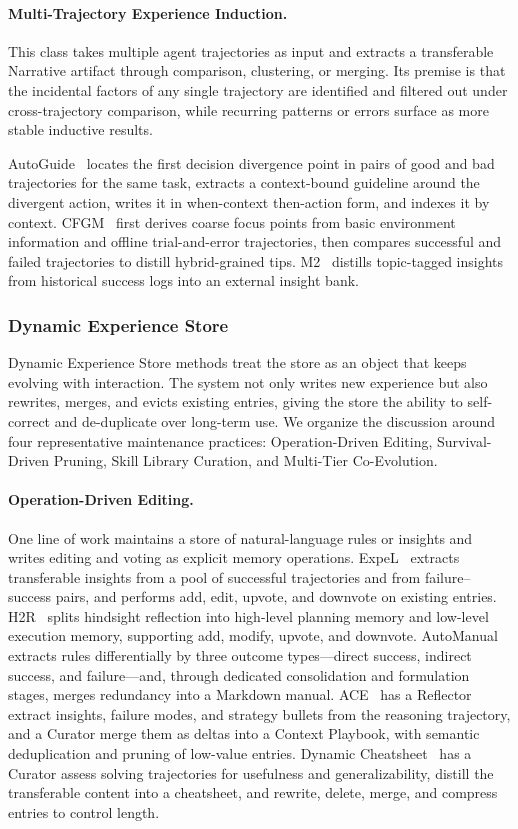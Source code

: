 \paragraph{Multi-Trajectory Experience Induction.} This class takes multiple agent trajectories as input and extracts a transferable Narrative artifact through comparison, clustering, or merging. Its premise is that the incidental factors of any single trajectory are identified and filtered out under cross-trajectory comparison, while recurring patterns or errors surface as more stable inductive results.

AutoGuide~\cite{Fu24} locates the first decision divergence point in pairs of good and bad trajectories for the same task, extracts a context-bound guideline around the divergent action, writes it in when-context then-action form, and indexes it by context. CFGM~\cite{Yan25} first derives coarse focus points from basic environment information and offline trial-and-error trajectories, then compares successful and failed trajectories to distill hybrid-grained tips. M2~\cite{Yan26b} distills topic-tagged insights from historical success logs into an external insight bank.

\subsubsection{Dynamic Experience Store}

Dynamic Experience Store methods treat the store as an object that keeps evolving with interaction. The system not only writes new experience but also rewrites, merges, and evicts existing entries, giving the store the ability to self-correct and de-duplicate over long-term use. We organize the discussion around four representative maintenance practices: Operation-Driven Editing, Survival-Driven Pruning, Skill Library Curation, and Multi-Tier Co-Evolution.

\paragraph{Operation-Driven Editing.} One line of work maintains a store of natural-language rules or insights and writes editing and voting as explicit memory operations. ExpeL~\cite{Zha23c} extracts transferable insights from a pool of successful trajectories and from failure--success pairs, and performs add, edit, upvote, and downvote on existing entries. H2R~\cite{Ye25b} splits hindsight reflection into high-level planning memory and low-level execution memory, supporting add, modify, upvote, and downvote. AutoManual~\cite{Che24} extracts rules differentially by three outcome types---direct success, indirect success, and failure---and, through dedicated consolidation and formulation stages, merges redundancy into a Markdown manual. ACE~\cite{Zha25f} has a Reflector extract insights, failure modes, and strategy bullets from the reasoning trajectory, and a Curator merge them as deltas into a Context Playbook, with semantic deduplication and pruning of low-value entries. Dynamic Cheatsheet~\cite{Suz25} has a Curator assess solving trajectories for usefulness and generalizability, distill the transferable content into a cheatsheet, and rewrite, delete, merge, and compress entries to control length.

